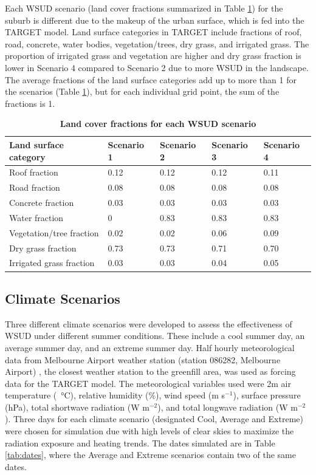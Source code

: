 \documentclass[final,3p,times,authoryear]{elsarticle}
\begin{document}
Each WSUD scenario (land cover fractions summarized in Table \ref{tab:parameters}) for the suburb is different due to the makeup of the urban surface, which is fed into the TARGET model. Land surface categories in TARGET include fractions of roof, road, concrete, water bodies, vegetation/trees, dry grass, and irrigated grass. The proportion of irrigated grass and vegetation are higher and dry grass fraction is lower in Scenario 4 compared to Scenario 2 due to more WSUD in the landscape. The average fractions of the land surface categories add up to more than 1 for the scenarios (Table \ref{tab:parameters}), but for each individual grid point, the sum of the fractions is 1.


\begin{table}[!htbp]
\caption{\bf Land cover fractions for each WSUD scenario  \label{tab:parameters}}     
\begin{tabular}{ l l l l l}
\textbf{Land surface category} & \textbf{Scenario 1} & \textbf{Scenario 2}  & \textbf{Scenario 3} & \textbf{Scenario 4}\\ \hline
Roof fraction & 0.12 & 0.12 & 0.12 & 0.11 \\ 
Road fraction & 0.08 & 0.08 & 0.08 & 0.08 \\ 
Concrete fraction & 0.03 & 0.03 & 0.03 & 0.03 \\ 
Water fraction & 0 & 0.83 & 0.83 & 0.83 \\ 
Vegetation/tree fraction & 0.02 & 0.02 & 0.06 & 0.09 \\ 
Dry grass fraction & 0.73 & 0.73 & 0.71 & 0.70 \\ 
Irrigated grass fraction & 0.03 & 0.03 & 0.04 & 0.05 \\ 
\hline
\end{tabular}
\end{table}


\subsection{Climate Scenarios}\label{sec:methods_climate_scenarios}

Three different climate scenarios were developed to assess the effectiveness of WSUD under different summer conditions. These include a cool summer day, an average summer day, and an extreme summer day. Half hourly meteorological data from Melbourne Airport weather station (station 086282, Melbourne Airport) \citep{BOM2016b}, the closest weather station to the greenfill area, was used as forcing data for the TARGET model. The meteorological variables used were 2m air temperature (\SI{}{\degreeCelsius}), relative humidity (\%), wind speed (m s$^{-1}$), surface pressure (hPa), total shortwave radiation (W m$^{-2}$), and total longwave radiation (W m$^{-2}$). Three days for each climate scenario (designated Cool, Average and Extreme) were chosen for simulation due with high levels of clear skies to maximize the radiation exposure and heating trends. The dates simulated are in Table \ref{tab:dates}, where the Average and Extreme scenarios contain two of the same dates.
\end{document}
